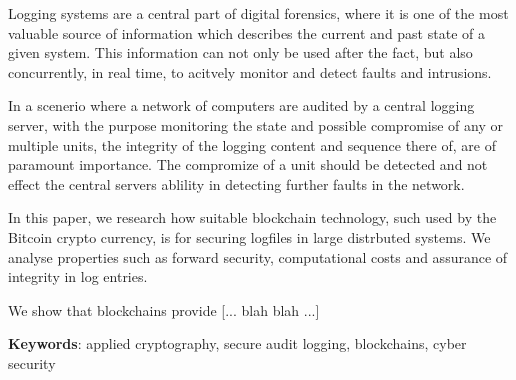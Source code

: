 
Logging systems are a central part of digital forensics, where it
is one of the most valuable source of information which describes
the current and past state of a given system. This information
can not only be used after the fact, but also concurrently, in
real time, to acitvely monitor and detect faults and intrusions.

In a scenerio where a network of computers are audited by a
central logging server, with the purpose monitoring the state and
possible compromise of any or multiple units, the integrity of
the logging content and sequence there of, are of paramount
importance. The compromize of a unit should be detected and not
effect the central servers ablility in detecting further faults
in the network.

In this paper, we research how suitable blockchain technology,
such used by the Bitcoin crypto currency, is for securing
logfiles in large distrbuted systems. We analyse properties such
as forward security, computational costs and assurance of
integrity in log entries.

We show that blockchains provide [... blah blah ...]

\textbf{Keywords}: applied cryptography, secure audit logging,
blockchains, cyber security
